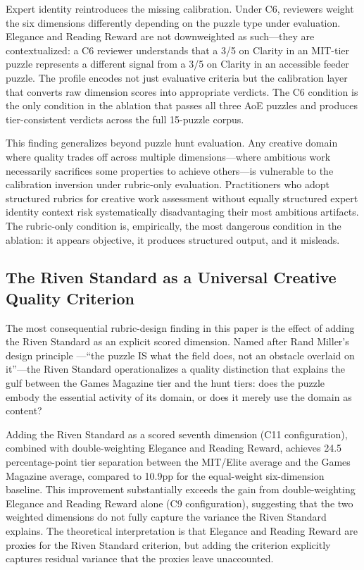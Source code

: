 Expert identity reintroduces the missing calibration. Under C6, reviewers weight the six
dimensions differently depending on the puzzle type under evaluation. Elegance and Reading
Reward are not downweighted as such---they are contextualized: a C6 reviewer understands
that a 3/5 on Clarity in an MIT-tier puzzle represents a different signal from a 3/5 on
Clarity in an accessible feeder puzzle. The profile encodes not just evaluative criteria but
the calibration layer that converts raw dimension scores into appropriate verdicts. The C6
condition is the only condition in the ablation that passes all three AoE puzzles and produces
tier-consistent verdicts across the full 15-puzzle corpus.

This finding generalizes beyond puzzle hunt evaluation. Any creative domain where quality
trades off across multiple dimensions---where ambitious work necessarily sacrifices some
properties to achieve others---is vulnerable to the calibration inversion under rubric-only
evaluation. Practitioners who adopt structured rubrics for creative work assessment without
equally structured expert identity context risk systematically disadvantaging their most
ambitious artifacts. The rubric-only condition is, empirically, the most dangerous condition
in the ablation: it appears objective, it produces structured output, and it misleads.

\subsection{The Riven Standard as a Universal Creative Quality Criterion}
\label{sec:riven-standard}

The most consequential rubric-design finding in this paper is the effect of adding the Riven
Standard as an explicit scored dimension. Named after Rand Miller's design principle
\cite{miller2016riven}---``the puzzle IS what the field does, not an obstacle overlaid on
it''---the Riven Standard operationalizes a quality distinction that explains the gulf between
the Games Magazine tier and the hunt tiers: does the puzzle embody the essential activity of
its domain, or does it merely use the domain as content?

Adding the Riven Standard as a scored seventh dimension (C11 configuration), combined with
double-weighting Elegance and Reading Reward, achieves 24.5 percentage-point tier separation
between the MIT/Elite average and the Games Magazine average, compared to 10.9pp for the
equal-weight six-dimension baseline. This improvement substantially exceeds the gain from
double-weighting Elegance and Reading Reward alone (C9 configuration), suggesting that the
two weighted dimensions do not fully capture the variance the Riven Standard explains. The
theoretical interpretation is that Elegance and Reading Reward are proxies for the Riven
Standard criterion, but adding the criterion explicitly captures residual variance that the
proxies leave unaccounted.

